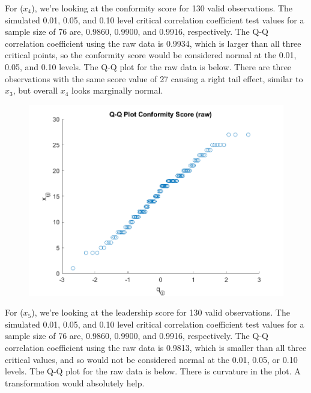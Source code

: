 \begin{enumerate}[label= (\alph*)]
    For ($x_{4}$), we're looking at the conformity score for 130 valid observations.
    The simulated 0.01, 0.05, and 0.10 level critical correlation coefficient test values for a sample size of 76 are, 0.9860, 0.9900, and 0.9916, respectively.
    The Q-Q correlation coefficient using the raw data is 0.9934, which is larger than all three critical points, so the conformity score would be considered normal at the 0.01, 0.05, and 0.10 levels. 
    The Q-Q plot for the raw data is below.
    There are three observations with the same score value of 27 causing a right tail effect, similar to $x_{3}$, but overall $x_{4}$ looks marginally normal.

    \begin{center}
        \begin{figure}[H]
            \centering
            \includegraphics[scale=0.6]{./matlab/chapter-4/sol4.39.qq.4.png}
        \end{figure}
    \end{center}

    For ($x_{5}$), we're looking at the leadership score for 130 valid observations.
    The simulated 0.01, 0.05, and 0.10 level critical correlation coefficient test values for a sample size of 76 are, 0.9860, 0.9900, and 0.9916, respectively.
    The Q-Q correlation coefficient using the raw data is 0.9813, which is smaller than all three critical values, and so would not be considered normal at the 0.01, 0.05, or 0.10 levels. 
    The Q-Q plot for the raw data is below. There is curvature in the plot. A transformation would absolutely help.


\end{enumerate}
